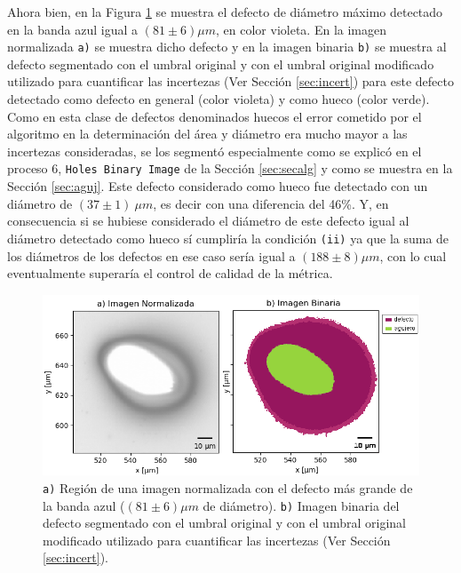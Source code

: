  Ahora bien, en la Figura \ref{fig:deffd} se muestra el defecto de diámetro máximo detectado en la banda azul igual a $(81 \pm 6) \mu m$, en color violeta. En la imagen normalizada \texttt{a)} se muestra dicho defecto y en la imagen binaria \texttt{b)} se muestra al defecto segmentado con el umbral original y con el umbral original modificado utilizado para cuantificar las incertezas (Ver Sección \ref{sec:incert}) para este defecto detectado como defecto en general (color violeta) y como hueco (color verde). Como en esta clase de defectos denominados huecos el error cometido por el algoritmo en la determinación del área y diámetro era mucho mayor a las incertezas consideradas, se los segmentó especialmente como se explicó en el proceso 6, \texttt{Holes Binary Image} de la Sección \ref{sec:secalg} y como se muestra en la Sección \ref{sec:aguj}. Este defecto considerado como hueco fue detectado con un diámetro de $(37 \pm 1)~\mu m$, es decir con una diferencia del 46\%. Y, en consecuencia si se hubiese considerado el diámetro de este defecto igual al diámetro detectado como hueco sí cumpliría la condición \texttt{(ii)} ya que la suma de los diámetros de los defectos en ese caso sería igual a $(188 \pm 8) \mu m$, con lo cual eventualmente superaría el control de calidad de la métrica. 
 
 \begin{figure}[H]
\centering
\includegraphics[scale=1.0]{Figs/cuantificaciondefectos/agujdefectocompar.png}
	\caption{\texttt{a)} Región de una imagen normalizada con el defecto más grande de la banda azul ($(81 \pm 6) \mu m$ de diámetro). \texttt{b)} Imagen binaria del defecto segmentado con el umbral original y con el umbral original modificado utilizado para cuantificar las incertezas (Ver Sección \ref{sec:incert}). }
\label{fig:deffd}
\end{figure}
 
